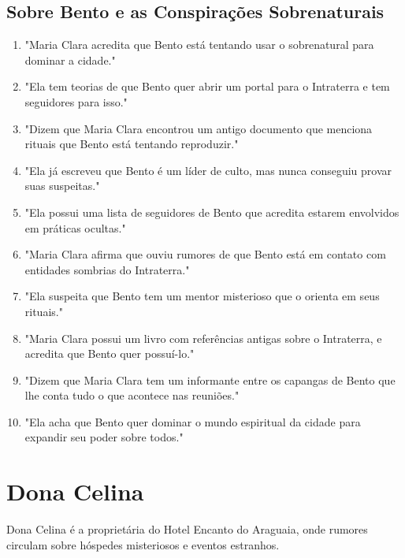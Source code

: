 \subsection*{Sobre Bento e as Conspirações Sobrenaturais}
\begin{enumerate}
    \item "Maria Clara acredita que Bento está tentando usar o sobrenatural para dominar a cidade."
    \item "Ela tem teorias de que Bento quer abrir um portal para o Intraterra e tem seguidores para isso."
    \item "Dizem que Maria Clara encontrou um antigo documento que menciona rituais que Bento está tentando reproduzir."
    \item "Ela já escreveu que Bento é um líder de culto, mas nunca conseguiu provar suas suspeitas."
    \item "Ela possui uma lista de seguidores de Bento que acredita estarem envolvidos em práticas ocultas."
    \item "Maria Clara afirma que ouviu rumores de que Bento está em contato com entidades sombrias do Intraterra."
    \item "Ela suspeita que Bento tem um mentor misterioso que o orienta em seus rituais."
    \item "Maria Clara possui um livro com referências antigas sobre o Intraterra, e acredita que Bento quer possuí-lo."
    \item "Dizem que Maria Clara tem um informante entre os capangas de Bento que lhe conta tudo o que acontece nas reuniões."
    \item "Ela acha que Bento quer dominar o mundo espiritual da cidade para expandir seu poder sobre todos."
\end{enumerate}

\section{Dona Celina}
Dona Celina é a proprietária do Hotel Encanto do Araguaia, onde rumores circulam sobre hóspedes misteriosos e eventos estranhos.

